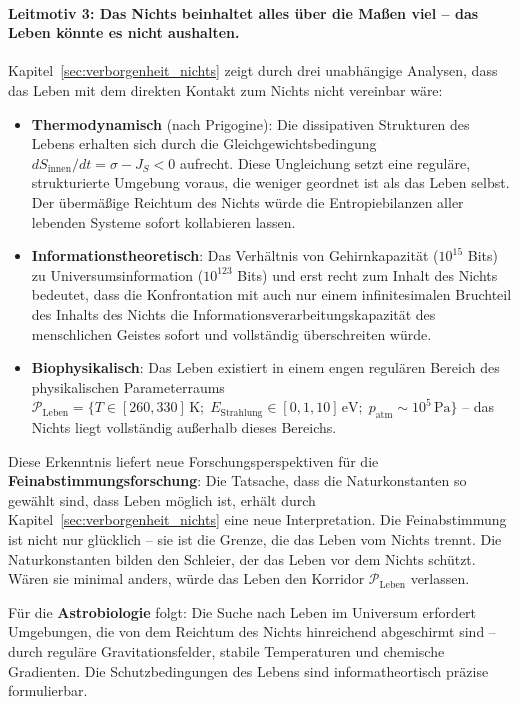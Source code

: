 ﻿\documentclass[12pt,a4paper]{report}
\begin{document}
\paragraph{Leitmotiv 3: Das Nichts beinhaltet alles über die Maßen viel -- das Leben könnte es nicht aushalten.}

Kapitel~\ref{sec:verborgenheit_nichts} zeigt durch drei unabhängige Analysen, dass das Leben mit dem direkten Kontakt zum Nichts nicht vereinbar wäre:

\begin{itemize}
	\item \textbf{Thermodynamisch} (nach Prigogine): Die dissipativen Strukturen des Lebens erhalten sich durch die Gleichgewichtsbedingung $dS_{\text{innen}}/dt = \sigma - J_S < 0$ aufrecht. Diese Ungleichung setzt eine reguläre, strukturierte Umgebung voraus, die weniger geordnet ist als das Leben selbst. Der übermäßige Reichtum des Nichts würde die Entropiebilanzen aller lebenden Systeme sofort kollabieren lassen.
	\item \textbf{Informationstheoretisch}: Das Verhältnis von Gehirnkapazität ($10^{15}$ Bits) zu Universumsinformation ($10^{123}$ Bits) und erst recht zum Inhalt des Nichts bedeutet, dass die Konfrontation mit auch nur einem infinitesimalen Bruchteil des Inhalts des Nichts die Informationsverarbeitungskapazität des menschlichen Geistes sofort und vollständig überschreiten würde.
	\item \textbf{Biophysikalisch}: Das Leben existiert in einem engen regulären Bereich des physikalischen Parameterraums $\mathcal{P}_{\text{Leben}} = \{T \in [260, 330]\,\text{K};\; E_{\text{Strahlung}} \in [0{,}1, 10]\,\text{eV};\; p_{\text{atm}} \sim 10^5\,\text{Pa}\}$ -- das Nichts liegt vollständig außerhalb dieses Bereichs.
\end{itemize}

Diese Erkenntnis liefert neue Forschungsperspektiven für die \textbf{Feinabstimmungsforschung}: Die Tatsache, dass die Naturkonstanten so gewählt sind, dass Leben möglich ist, erhält durch Kapitel~\ref{sec:verborgenheit_nichts} eine neue Interpretation. Die Feinabstimmung ist nicht nur \glqq glücklich\grqq{} -- sie ist die Grenze, die das Leben vom Nichts trennt. Die Naturkonstanten bilden den Schleier, der das Leben vor dem Nichts schützt. Wären sie minimal anders, würde das Leben den Korridor $\mathcal{P}_{\text{Leben}}$ verlassen.

Für die \textbf{Astrobiologie} folgt: Die Suche nach Leben im Universum erfordert Umgebungen, die von dem Reichtum des Nichts hinreichend abgeschirmt sind -- durch reguläre Gravitationsfelder, stabile Temperaturen und chemische Gradienten. Die Schutzbedingungen des Lebens sind informatheortisch präzise formulierbar.
\end{document}

